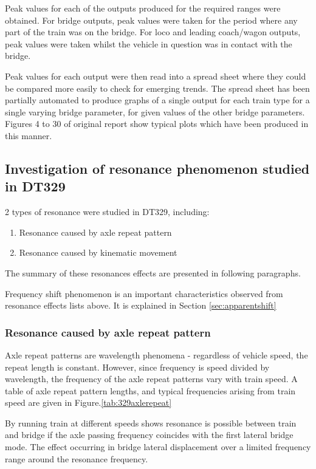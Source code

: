 Peak values for each of the outputs produced for the required ranges were obtained. For bridge outputs, peak values were taken for the period where any part of the train was on the bridge. For loco and leading coach/wagon outputs, peak values were taken whilst the vehicle in question was in contact with the bridge.

Peak values for each output were then read into a spread sheet where they could be compared more easily to check for emerging trends. The spread sheet has been partially automated to produce graphs of a single output for each train type for a single varying bridge parameter, for given values of the other bridge parameters. Figures 4 to 30 of original \citet{d181dt329} report show typical plots which have been produced in this manner.

\subsection{Investigation of resonance phenomenon studied in DT329}\label{sec:resonance329}

2 types of resonance were studied in DT329, including:

\begin{enumerate}
    \item Resonance caused by axle repeat pattern
    \item Resonance caused by kinematic movement
\end{enumerate}

The summary of these resonances effects are presented in following paragraphs. 

Frequency shift phenomenon is an important characteristics observed from resonance effects lists above. It is explained in Section \ref{sec:apparentshift}

\subsubsection{Resonance caused by axle repeat pattern}

Axle repeat patterns are wavelength phenomena - regardless of vehicle speed, the repeat length is constant. However, since frequency is speed divided by wavelength, the frequency of the axle repeat patterns vary with train speed. A table of axle repeat pattern lengths, and typical frequencies arising from train speed are given in Figure.\ref{tab:329axlerepeat}

By running train at different speeds shows resonance is possible between train and bridge if the axle passing frequency coincides with the first lateral bridge mode. The effect occurring in bridge lateral displacement over a limited frequency range around the resonance frequency.



